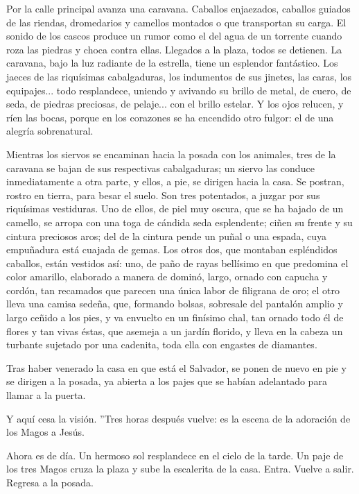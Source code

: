 \documentclass[12pt]{book} %
\begin{document}
Por la calle principal avanza una caravana. Caballos enjaezados, caballos guiados de las riendas, dromedarios y camellos montados o que transportan su carga. El sonido de los cascos produce un rumor como el del agua de un torrente cuando roza las piedras y choca contra ellas. Llegados a la plaza, todos se detienen. La caravana, bajo la luz radiante de la estrella, tiene un esplendor fantástico. Los jaeces de las riquísimas cabalgaduras, los indumentos de sus jinetes, las caras, los equipajes... todo resplandece, uniendo y avivando su brillo de metal, de cuero, de seda, de piedras preciosas, de pelaje... con el brillo estelar. Y los ojos relucen, y ríen las bocas, porque en los corazones se ha encendido otro fulgor: el de una alegría sobrenatural. 

Mientras los siervos se encaminan hacia la posada con los animales, tres de la caravana se bajan de sus respectivas cabalgaduras; un siervo las conduce inmediatamente a otra parte, y ellos, a pie, se dirigen hacia la casa. Se postran, rostro en tierra, para besar el suelo. Son tres potentados, a juzgar por sus riquísimas vestiduras. Uno de ellos, de piel muy oscura, que se ha bajado de un camello, se arropa con una toga de cándida seda esplendente; ciñen su frente y su cintura preciosos aros; del de la cintura pende un puñal o una espada, cuya empuñadura está cuajada de gemas. Los otros dos, que montaban espléndidos caballos, están vestidos así: uno, de paño de rayas bellísimo en que predomina el color amarillo, elaborado a manera de dominó, largo, ornado con capucha y cordón, tan recamados que parecen una única labor de filigrana de oro; el otro lleva una camisa sedeña, que, formando bolsas, sobresale del pantalón amplio y largo ceñido a los pies, y va envuelto en un finísimo chal, tan ornado todo él de flores y tan vivas éstas, que asemeja a un jardín florido, y lleva en la cabeza un turbante sujetado por una cadenita, toda ella con engastes de diamantes. 

Tras haber venerado la casa en que está el Salvador, se ponen de nuevo en pie y se dirigen a la posada, ya abierta a los pajes que se habían adelantado para llamar a la puerta. 

Y aquí cesa la visión. ''Tres horas después vuelve: es la escena de la adoración de los Magos a Jesús. 

Ahora es de día. Un hermoso sol resplandece en el cielo de la tarde. Un paje de los tres Magos cruza la plaza y sube la escalerita de la casa. Entra. Vuelve a salir. Regresa a la posada. 
\end{document}
